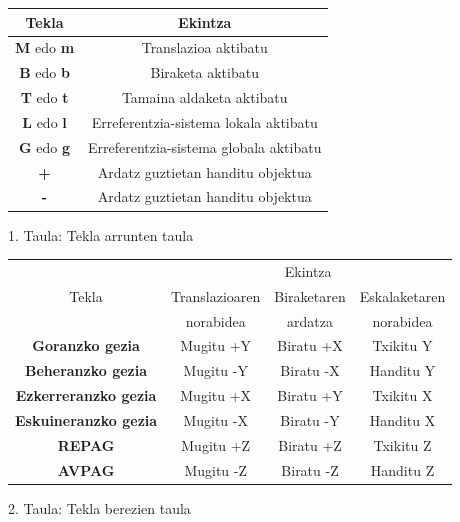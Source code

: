\documentclass[12pt]{article}
\newcommand{\tekla}[1] {\textbf{#1}}
\begin{document}
\begin{center}

\begin{tabular}{|c|c|}
																				\hline
	Tekla							& Ekintza									\\	\hline
	\textbf{M} edo \textbf{m}		& Translazioa aktibatu						\\	\hline
	\textbf{B} edo \textbf{b}		& Biraketa aktibatu							\\	\hline
	\textbf{T} edo \textbf{t}		& Tamaina aldaketa aktibatu					\\	\hline
	\textbf{L} edo \textbf{l}		& Erreferentzia-sistema lokala aktibatu	\\	\hline
	\textbf{G} edo \textbf{g}		& Erreferentzia-sistema globala aktibatu	\\	\hline
	\textbf{+}						& Ardatz guztietan handitu objektua		\\	\hline
	\textbf{-}						& Ardatz guztietan handitu objektua		\\	\hline
\end{tabular}

\vspace{0.3cm}
1. Taula: Tekla arrunten taula
\end{center}

\begin{center}

\begin{tabular}{|c|c|c|c|}
																			\hline
	\multirow{3}{*}{Tekla}		& \multicolumn{3}{|c|}{Ekintza} 		\\	\cline{2-4}
	& Translazioaren  & Biraketaren  & Eskalaketaren 					\\ 
	&  norabidea &  ardatza &  norabidea 								\\	\hline
	\tekla{Goranzko gezia}		 &  Mugitu +Y & Biratu +X & Txikitu Y	\\	\hline
	\tekla{Beheranzko gezia}	 &  Mugitu -Y & Biratu -X & Handitu Y	\\	\hline
	\tekla{Ezkerreranzko gezia}&  Mugitu +X & Biratu +Y & Txikitu X	\\	\hline
	\tekla{Eskuineranzko gezia}&  Mugitu -X & Biratu -Y & Handitu X	\\	\hline
	\tekla{REPAG}				 &  Mugitu +Z & Biratu +Z & Txikitu Z	\\	\hline
	\tekla{AVPAG}				 &  Mugitu -Z & Biratu -Z & Handitu Z	\\	\hline
\end{tabular}

\vspace{0.3cm}
2. Taula: Tekla berezien taula
\end{center}
\end{document}
